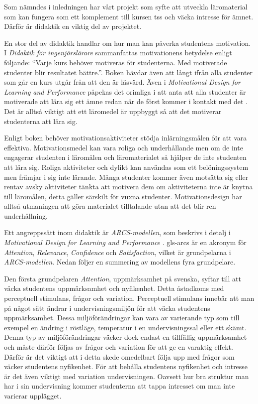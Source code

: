 \documentclass[12pt,a4paper,twoside,openright]{article}
\begin{document}
Som nämndes i inledningen har vårt projekt som syfte att utveckla
läromaterial som kan fungera som ett komplement till kursen \gls{tss}
och väcka intresse för ämnet. Därför är didaktik en viktig del av
projektet.

En stor del av didaktik handlar om hur man kan påverka studentens
motivation. I \textit{Didaktik för ingenjörslärare} sammanfattas
motivationens betydelse enligt följande: ``Varje kurs behöver
motiveras för studenterna. Med motiverade studenter blir resultatet
bättre.''.  Boken hävdar även att långt ifrån alla studenter som går
en kurs utgår från att den är läsvärd. Även i \textit{Motivational
  Design for Learning and Performance} påpekas det orimliga i att anta
att alla studenter är motiverade att lära sig ett ämne redan när de
först kommer i kontakt med det \cite{motivational_design}. Det är
alltså viktigt att ett läromedel är uppbyggt så att det motiverar
studenterna att lära sig.

Enligt boken behöver motivations\-aktiviteter stödja inlärningsmålen
för att vara effektiva. Motivationsmedel kan vara roliga och
underhållande men om de inte engagerar studenten i läromålen och
läromaterialet så hjälper de inte studenten att lära sig. Roliga
aktiviteter och dylikt kan användas som ett belöningssystem men
främjar i sig inte lärande. Många studenter kommer även motsätta sig
eller rentav avsky aktiviteter tänkta att motivera dem om
aktiviteterna inte är knytna till läromålen, detta gäller särskilt för
vuxna studenter.  Motivationsdesign har alltså utmaningen att göra
materialet tilltalande utan att det blir ren underhållning.

Ett angreppssätt inom didaktik är \textit{ARCS-modellen}, som beskrivs
i detalj i \textit{Motivational Design for Learning and Performance}
\cite{motivational_design}. \gls{gls-arcs} är en akronym för
\textit{Attention}, \textit{Relevance}, \textit{Confidence} och
\textit{Satisfaction}, vilket är grundpelarna i
\textit{ARCS-modellen}. Nedan följer en summering av modellens fyra
grundpelare.

Den första grundpelaren \textit{Attention}, uppmärksamhet på svenska,
syftar till att väcka studentens uppmärksamhet och nyfikenhet.  Detta
åstadkoms med perceptuell stimulans, frågor och variation.
Perceptuell stimulans innebär att man på något sätt ändrar i
undervisningsmiljön för att väcka studentens uppmärksamhet. Dessa
miljöförändringar kan vara av varierande typ som till exempel en
ändring i röstläge, temperatur i en undervisningssal eller ett skämt.
Denna typ av miljöförändringar väcker dock endast en tillfällig
uppmärksamhet och måste därför följas av frågor och variation för att
ge en varaktig effekt. Därför är det viktigt att i detta skede
omedelbart följa upp med frågor som väcker studentens nyfikenhet. För
att behålla studentens nyfikenhet och intresse är det även viktigt med
variation undervisningen. Oavsett hur bra struktur man har i sin
undervisning kommer studenterna att tappa intresset om man inte
varierar upplägget.
\end{document}
